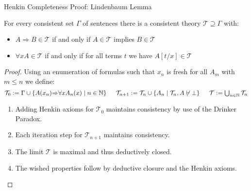 \documentclass[xcolor=dvipsnames,aspectratio=169,handout]{beamer}
\renewcommand{\to}{\Rightarrow}
\newcommand{\TT}{\mathcal{T}}
\begin{document}
\begin{frame}{Henkin Completeness Proof: Lindenbaum Lemma}
	\begin{lemma}[Lindenbaum]
		For every consistent set $\Gamma$ of sentences there is a consistent theory $\TT\supseteq \Gamma$ with:
		\begin{itemize}
			\item
			$A\to B\in \TT$ if and only if $A\in \TT$ implies $B\in \TT$
			\item
			$\forall x A\in \TT$ if and only if for all terms $t$ we have $A[t/x]\in \TT$
		\end{itemize}
	\end{lemma}
	
	\pause
	\begin{proof}
		\pause
		Using an enumeration of formulas such that $x_n$ is fresh for all $A_m$ with $m\le n$ we define:
		$$\textstyle \TT_0 := \Gamma \cup \{A(x_n){\to} \forall xA_n(x)\mid n\in \mathbb{N}\}
		\hspace{1.5em}
		\TT_{n+1}:= \TT_n\cup \{A_n \mid \TT_n,A\not\vdash\bot \}
		\hspace{1.5em}
		\TT :=\bigcup_{n\in \mathbb{N}} \TT_n
		$$
		\vspace{-0.5cm}
		\begin{enumerate}
			\pause
			\item
			Adding Henkin axioms for $\TT_0$ maintains consistency by use of the Drinker Paradox.
			\item
			Each iteration step for $\TT_{n+1}$ maintains consistency.
			\pause
			\item
			The limit $\TT$ is maximal and thus deductively closed.
			\pause
			\item
			The wished properties follow by deductive closure and the Henkin axioms.
			\qedhere
		\end{enumerate}
	\end{proof}
\end{frame}
\end{document}
